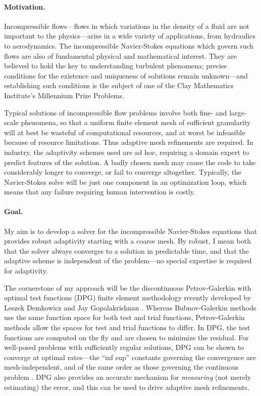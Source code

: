 \documentclass[12pt,c]{article}
\begin{document}
\paragraph{Motivation.} Incompressible flows---flows in which variations in the density of a fluid are not important to the physics---arise in a wide variety of applications, from hydraulics to aerodynamics.  The incompressible Navier-Stokes equations which govern such flows are also of fundamental physical and mathematical interest.  They are believed to hold the key to understanding turbulent phenomena; precise conditions for the existence and uniqueness of solutions remain unknown---and establishing such conditions is the subject of one of the Clay Mathematics Institute's Millennium Prize Problems.

Typical solutions of incompressible flow problems involve both fine- and large-scale phenomena, so that a uniform finite element mesh of sufficient granularity will at best be wasteful of computational resources, and at worst be infeasible because of resource limitations.  Thus adaptive mesh refinements are required.  In industry, the adaptivity schemes used are ad hoc, requiring a domain expert to predict features of the solution.  A badly chosen mesh may cause the code to take considerably longer to converge, or fail to converge altogether.  Typically, the Navier-Stokes solve will be just one component in an optimization loop, which means that any failure requiring human intervention is costly.

\paragraph{Goal.} My aim is to develop a solver for the incompressible Navier-Stokes equations that provides robust adaptivity starting with a coarse mesh.  By robust, I mean both that the solver always converges to a solution in predictable time, and that the adaptive scheme is independent of the problem---no special expertise is required for adaptivity.

The cornerstone of my approach will be the discontinuous Petrov-Galerkin with optimal test functions (DPG) finite element methodology recently developed by Leszek Demkowicz and Jay Gopalakrishnan \cite{DPG1,DPG2}.  Whereas Bubnov-Galerkin methods use the same function space for both test and trial functions, Petrov-Galerkin methods allow the spaces for test and trial functions to differ.  In DPG, the test functions are computed on the fly and are chosen to minimize the residual.  For well-posed problems with sufficiently regular solutions, DPG can be shown to converge at optimal rates---the ``inf sup'' constants governing the convergence are mesh-independent, and of the same order as those governing the continuous problem \cite{DPGStokes}.  DPG also provides an accurate mechanism for \emph{measuring} (not merely estimating) the error, and this can be used to drive adaptive mesh refinements.
\end{document}

